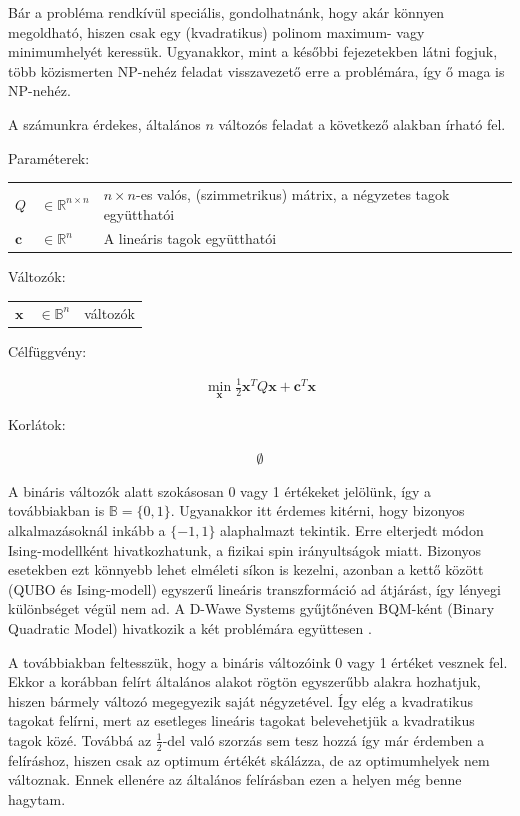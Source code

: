 Bár a probléma rendkívül speciális, gondolhatnánk, hogy akár könnyen megoldható, hiszen csak egy (kvadratikus) polinom maximum- vagy minimumhelyét keressük. Ugyanakkor, mint a későbbi fejezetekben látni fogjuk, több közismerten NP-nehéz feladat visszavezető erre a problémára, így ő maga is NP-nehéz. 

A számunkra érdekes, általános $n$ változós feladat a következő alakban írható fel.

Paraméterek:

\begin{tabular}{lll}
	$Q$ & $\in \mathbb{R}^{n×n}$  & $n × n$-es valós, (szimmetrikus) mátrix, a négyzetes tagok együtthatói \\
	$\mathbf{c}$ & $\in \mathbb{R}^n$   & A lineáris tagok együtthatói \\
\end{tabular}

Változók:

\begin{tabular}{lll}
	$\mathbf{x}$ & $\in \mathbb{B}^n$ & változók \\
\end{tabular}

Célfüggvény:

\begin{align}
	\min_{\mathbf{x}} \frac{1}{2} \mathbf{x}^T Q \mathbf{x} + \mathbf{c}^T \mathbf{x} 
\end{align}

Korlátok:

\begin{align}
	\emptyset
\end{align}

A bináris változók alatt szokásosan 0 vagy 1 értékeket jelölünk, így a továbbiakban is $\mathbb{B}=\{0,1\}$. Ugyanakkor itt érdemes kitérni, hogy bizonyos alkalmazásoknál inkább a $\{-1,1\}$ alaphalmazt tekintik. Erre elterjedt módon Ising-modellként hivatkozhatunk, a fizikai spin irányultságok miatt. Bizonyos esetekben ezt könnyebb lehet elméleti síkon is kezelni, azonban a kettő között (QUBO és Ising-modell) egyszerű lineáris transzformáció ad átjárást, így lényegi különbséget végül nem ad. A D-Wawe Systems gyűjtőnéven BQM-ként (Binary Quadratic Model) hivatkozik a két problémára együttesen \cite{DWaveOceanBQM}.

A továbbiakban feltesszük, hogy a bináris változóink 0 vagy 1 értéket vesznek fel. Ekkor a korábban felírt általános alakot rögtön egyszerűbb alakra hozhatjuk, hiszen bármely változó megegyezik saját négyzetével. Így elég a kvadratikus tagokat felírni, mert az esetleges lineáris tagokat belevehetjük a kvadratikus tagok közé. Továbbá az $\frac{1}{2}$-del való szorzás sem tesz hozzá így már érdemben a felíráshoz, hiszen csak az optimum értékét skálázza, de az optimumhelyek nem változnak. Ennek ellenére az általános felírásban ezen a helyen még benne hagytam.

